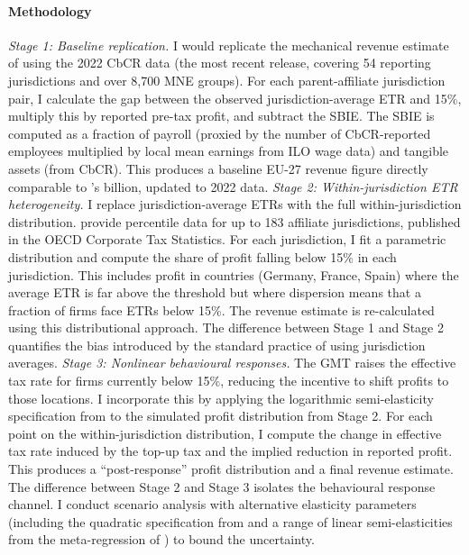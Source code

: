 \documentclass[11pt,a4paper]{article}
\newcommand{\EUR}{\texteuro}
\begin{document}
\paragraph{Methodology} \textit{Stage 1: Baseline replication.} I would replicate the mechanical revenue estimate of \citeauthor{barake2022} using the 2022 CbCR data (the most recent release, covering 54 reporting jurisdictions and over 8,700 MNE groups). For each parent-affiliate jurisdiction pair, I calculate the gap between the observed jurisdiction-average ETR and 15\%, multiply this by reported pre-tax profit, and subtract the SBIE. The SBIE is computed as a fraction of payroll (proxied by the number of CbCR-reported employees multiplied by local mean earnings from ILO wage data) and tangible assets (from CbCR). This produces a baseline EU-27 revenue figure directly comparable to \citeauthor{barake2022}'s \EUR 55 billion, updated to 2022 data. \textit{Stage 2: Within-jurisdiction ETR heterogeneity.} I replace jurisdiction-average ETRs with the full within-jurisdiction distribution. \citeauthor{hugger2025} provide percentile data for up to 183 affiliate jurisdictions, published in the OECD Corporate Tax Statistics. For each jurisdiction, I fit a parametric distribution and compute the share of profit falling below 15\% in each jurisdiction. This includes profit in countries (Germany, France, Spain) where the average ETR is far above the threshold but where dispersion means that a fraction of firms face ETRs below 15\%. The revenue estimate is re-calculated using this distributional approach. The difference between Stage 1 and Stage 2 quantifies the bias introduced by the standard practice of using jurisdiction averages. \textit{Stage 3: Nonlinear behavioural responses.} The GMT raises the effective tax rate for firms currently below 15\%, reducing the incentive to shift profits to those locations. I incorporate this by applying the logarithmic semi-elasticity specification from \citet{garcia2024} to the simulated profit distribution from Stage 2. For each point on the within-jurisdiction distribution, I compute the change in effective tax rate induced by the top-up tax and the implied reduction in reported profit. This produces a ``post-response'' profit distribution and a final revenue estimate. The difference between Stage 2 and Stage 3 isolates the behavioural response channel. I conduct scenario analysis with alternative elasticity parameters (including the quadratic specification from \citeauthor{dowd2017} and a range of linear semi-elasticities from the meta-regression of \citeauthor{heckemeyer2017}) to bound the uncertainty.
\end{document}
